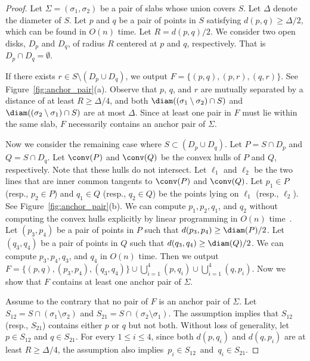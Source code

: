 \begin{proof}
    Let $\Sigma = (\sigma_1, \sigma_2)$ be a pair of slabs whose union covers $S$.
    Let $\Delta$ denote the diameter of $S$. 
    Let $p$ and $q$ be a pair of points in $S$ satisfying $d(p, q) \ge \Delta/2$, which can be found in $O(n)$ time.
    Let $R = d(p, q)/2$. 
    We consider two open disks, $D_p$ and $D_q$, of radius $R$ centered at $p$ and $q$, respectively. 
    That is $D_p \cap D_q = \emptyset$.

    If there exists $r\in S\setminus (D_p\cup D_q)$, 
    we output $F = \{(p,q ), (p, r), (q, r) \}$. See Figure~\ref{fig:anchor_pair}(a). 
    Observe that $p$, $q$, and $r$ are mutually separated by a distance of at least $R \geq \Delta/4$, and both $\diam((\sigma_1 \setminus \sigma_2) \cap S)$ and $\diam((\sigma_2 \setminus \sigma_1) \cap S)$ are at most $\Delta$.
    Since at least one pair in $F$ must lie within the same slab, $F$ necessarily contains an anchor pair of $\Sigma$.

    Now we consider the remaining case where $S\subset (D_p \cup D_q)$. 
    Let $P = S\cap D_p$ and $Q = S\cap D_q$. 
    Let $\conv(P)$ and $\conv(Q)$ be the convex hulls of $P$ and $Q$, respectively. Note that these hulls do not intersect. 
    Let $\ell_1$ and $\ell_2$ be the two lines that are inner common tangents to $\conv(P)$ and $\conv(Q)$. 
    Let $p_1 \in P$ (resp., $p_2 \in P$) and $q_1 \in Q$ (resp., $q_2 \in Q$) be the points lying on $\ell_1$ (resp., $\ell_2$). 
    See Figure~\ref{fig:anchor_pair}(b).
    We can compute $p_1, p_2, q_1$, and $q_2$ without computing the convex hulls explicitly by linear programming in $O(n)$ time~\cite{Dyer1984LinearTime_LP, Megiddo1984LinearTime_LP}. 
    Let $(p_3, p_4)$ be a pair of points in $P$ such that $d(p_3, p_4) \ge \diam(P)/2$. 
    Let $(q_3, q_4)$ be a pair of points in $Q$ such that $d(q_3, q_4) \ge \diam(Q)/2$. We can compute $p_3, p_4, q_3$, and $q_4$ in $O(n)$ time. 
    Then we output $F = \{(p, q), (p_3, p_4), (q_3, q_4) \} \cup \bigcup_{i=1}^4 (p, q_i)  \cup \bigcup_{i=1}^4 (q, p_i)$. Now we show that $F$ contains at least one anchor pair of $\Sigma$.

    Assume to the contrary that no pair of $F$ is an anchor pair of $\Sigma$. 
    Let $S_{12} = S\cap (\sigma_1 \setminus \sigma_2)$ and $S_{21} = S\cap (\sigma_2 \setminus \sigma_1)$.
    The assumption implies that $S_{12}$ (resp., $S_{21}$) contains either $p$ or $q$ but not both. 
    Without loss of generality, let $p\in S_{12}$ and $q \in S_{21}$. 
    For every $1\le i \le 4$, since both $d(p, q_i)$ and $d(q, p_i)$ are at least $R \ge \Delta/4$, the assumption also implies~$p_i \in S_{12}$~and~$q_i \in S_{21}$.


\end{proof}
